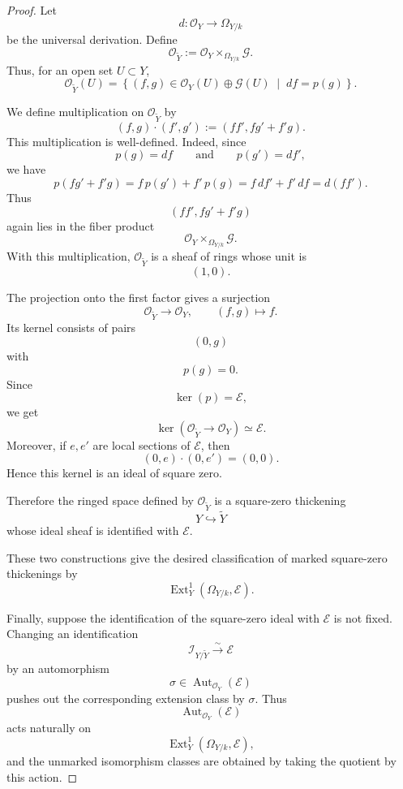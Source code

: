\documentclass[11pt,twoside]{amsart}
\theoremstyle{plain}
\numberwithin{equation}{section}
\theoremstyle{definition}
\begin{document}
\begin{proof}
Let
\[
    d:\mathcal O_Y\longrightarrow \Omega_{Y/k}
\]
be the universal derivation. Define
\[
    \mathcal O_{\widetilde Y}
    :=
    \mathcal O_Y\times_{\Omega_{Y/k}}\mathcal G.
\]
Thus, for an open set \(U\subset Y\),
\[
    \mathcal O_{\widetilde Y}(U)
    =
    \left\{
        (f,g)\in \mathcal O_Y(U)\oplus\mathcal G(U)
        \;\middle|\;
        df=p(g)
    \right\}.
\]

We define multiplication on \(\mathcal O_{\widetilde Y}\) by
\[
    (f,g)\cdot(f',g')
    :=
    (ff',fg'+f'g).
\]
This multiplication is well-defined. Indeed, since
\[
    p(g)=df
    \qquad\text{and}\qquad
    p(g')=df',
\]
we have
\[
    p(fg'+f'g)
    =
    f\,p(g')+f'\,p(g)
    =
    f\,df'+f'\,df
    =
    d(ff').
\]
Thus
\[
    (ff',fg'+f'g)
\]
again lies in the fiber product
\[
    \mathcal O_Y\times_{\Omega_{Y/k}}\mathcal G.
\]
With this multiplication, \(\mathcal O_{\widetilde Y}\) is a sheaf of rings whose unit is
\[
    (1,0).
\]

The projection onto the first factor gives a surjection
\[
    \mathcal O_{\widetilde Y}
    \longrightarrow
    \mathcal O_Y,
    \qquad
    (f,g)\longmapsto f.
\]
Its kernel consists of pairs
\[
    (0,g)
\]
with
\[
    p(g)=0.
\]
Since
\[
    \ker(p)=\mathcal E,
\]
we get
\[
    \ker(\mathcal O_{\widetilde Y}\to\mathcal O_Y)\simeq\mathcal E.
\]
Moreover, if \(e,e'\) are local sections of \(\mathcal E\), then
\[
    (0,e)\cdot(0,e')=(0,0).
\]
Hence this kernel is an ideal of square zero.

Therefore the ringed space defined by \(\mathcal O_{\widetilde Y}\) is a square-zero
thickening
\[
    Y\hookrightarrow \widetilde Y
\]
whose ideal sheaf is identified with \(\mathcal E\).

These two constructions give the desired classification of marked square-zero thickenings
by
\[
    \operatorname{Ext}^{1}_{Y}(\Omega_{Y/k},\mathcal E).
\]

Finally, suppose the identification of the square-zero ideal with \(\mathcal E\) is not fixed.
Changing an identification
\[
    \mathcal I_{Y/\widetilde Y}\xrightarrow{\sim}\mathcal E
\]
by an automorphism
\[
    \sigma\in \operatorname{Aut}_{\mathcal O_Y}(\mathcal E)
\]
pushes out the corresponding extension class by \(\sigma\). Thus
\[
    \operatorname{Aut}_{\mathcal O_Y}(\mathcal E)
\]
acts naturally on
\[
    \operatorname{Ext}^{1}_{Y}(\Omega_{Y/k},\mathcal E),
\]
and the unmarked isomorphism classes are obtained by taking the quotient by this action.
\end{proof}
\end{document}
